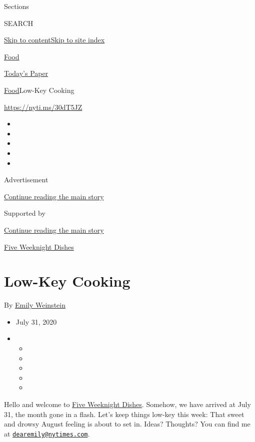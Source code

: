 Sections

SEARCH

\protect\hyperlink{site-content}{Skip to
content}\protect\hyperlink{site-index}{Skip to site index}

\href{https://www.nytimes.com/section/food}{Food}

\href{https://myaccount.nytimes.com/auth/login?response_type=cookie\&client_id=vi}{}

\href{https://www.nytimes.com/section/todayspaper}{Today's Paper}

\href{/section/food}{Food}\textbar{}Low-Key Cooking

\url{https://nyti.ms/30dT5JZ}

\begin{itemize}
\item
\item
\item
\item
\item
\end{itemize}

Advertisement

\protect\hyperlink{after-top}{Continue reading the main story}

Supported by

\protect\hyperlink{after-sponsor}{Continue reading the main story}

\href{/column/five-weeknight-dishes}{Five Weeknight Dishes}

\hypertarget{low-key-cooking}{%
\section{Low-Key Cooking}\label{low-key-cooking}}

By \href{https://www.nytimes.com/by/emily-weinstein}{Emily Weinstein}

\begin{itemize}
\item
  July 31, 2020
\item
  \begin{itemize}
  \item
  \item
  \item
  \item
  \item
  \end{itemize}
\end{itemize}

Hello and welcome to
\href{https://www.nytimes.com/column/five-weeknight-dishes}{Five
Weeknight Dishes}. Somehow, we have arrived at July 31, the month gone
in a flash. Let's keep things low-key this week: That sweet and drowsy
August feeling is about to set in. Ideas? Thoughts? You can find me at
\href{mailto:dearemily@nytimes.com}{\nolinkurl{dearemily@nytimes.com}}.

